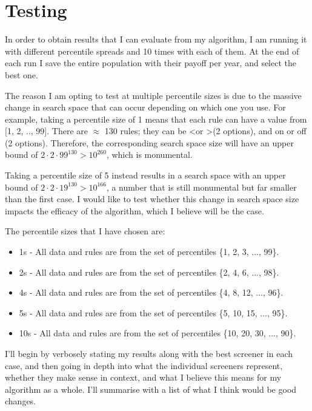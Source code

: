 \section{Testing}

In order to obtain results that I can evaluate from my algorithm, I am running it with different percentile spreads and 10 times with each of them. At the end of each run I save the entire population with their payoff per year, and select the best one. \newline

The reason I am opting to test at multiple percentile sizes is due to the massive change in search space that can occur depending on which one you use. For example, taking a percentile size of 1 means that each rule can have a value from [1, 2, .., 99]. There are $\approx$ 130 rules; they can be \textless or \textgreater (2 options), and on or off (2 options). Therefore, the corresponding search space size will have an upper bound of $2 \cdot 2 \cdot 99^{130} > 10^{260}$, which is monumental. \newline

Taking a percentile size of 5 instead results in a search space with an upper bound of $2 \cdot 2 \cdot19^{130} > 10^{166}$, a number that is still monumental but far smaller than the first case. I would like to test whether this change in search space size impacts the efficacy of the algorithm, which I believe will be the case. \newline

The percentile sizes that I have chosen are:
\begin{itemize}
    \item 1s - All data and rules are from the set of percentiles \{1, 2, 3, ..., 99\}.
    \item 2s - All data and rules are from the set of percentiles \{2, 4, 6, ..., 98\}.
    \item 4s - All data and rules are from the set of percentiles \{4, 8, 12, ..., 96\}.
    \item 5s - All data and rules are from the set of percentiles \{5, 10, 15, ..., 95\}.
    \item 10s - All data and rules are from the set of percentiles \{10, 20, 30, ..., 90\}.
\end{itemize}

I'll begin by verbosely stating my results along with the best screener in each case, and then going in depth into what the individual screeners represent, whether they make sense in context, and what I believe this means for my algorithm as a whole. I'll summarise with a list of what I think would be good changes.

